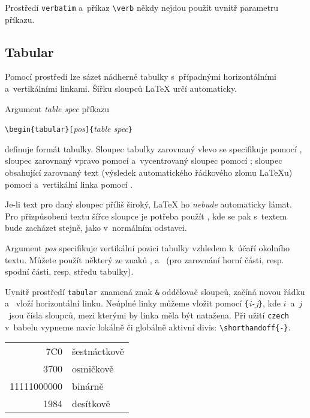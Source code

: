 Prostředí \texttt{verbatim} a~příkaz \verb|\verb| někdy nejdou použít
uvnitř parametru příkazu.

 
\subsection{Tabular}

\newcommand{\mfr}[1]{\framebox{\rule{0pt}{0.7em}\texttt{#1}}}

Pomocí prostředí  lze sázet nádherné tabulky
s~případnými horizontálními a~vertikálními linkami. Šířku sloupců
\LaTeX{} určí automaticky.

Argument \emph{table spec} příkazu
\begin{lscommand}
\verb|\begin{tabular}[|\emph{pos}\verb|]{|\emph{table spec}\verb|}|
\end{lscommand} 
\noindent definuje formát tabulky. Sloupec tabulky zarovnaný vlevo
se specifikuje pomocí \mfr{l}, sloupec zarovnaný vpravo pomocí \mfr{r}
a~vycentrovaný sloupec pomocí \mfr{c}; sloupec obsahující zarovnaný
text (výsledek automatického řádkového zlomu \LaTeX u) pomocí
\mfr{p\{\emph{width}\}} a~vertikální linka pomocí \mfr{|}.

Je-li text pro daný sloupec příliš široký, \LaTeX{} ho
\emph{nebude} automaticky lámat. Pro přizpůsobení textu šířce sloupce
je potřeba použít \mfr{p\{\emph{width}\}}, kde se pak s~textem
bude zacházet stejně, jako v~normálním odstavci.

Argument \emph{pos} specifikuje vertikální pozici tabulky vzhledem
k~účaří okolního textu. Můžete použít některý ze znaků \mfr{t}, \mfr{b}
a~\mfr{c} (pro zarovnání horní části, resp. spodní části, resp. středu
tabulky).
 
Uvnitř prostředí \texttt{tabular} znamená znak \texttt{\&} oddělovač
sloupců, \ci{\bs} začíná novou řádku a~ vloží horizontální
linku.  Neúplné linky můžeme vložit pomocí
\texttt{\{}\emph{i}\texttt{-}\emph{j}\texttt{\}},
kde $i$~a~$j$~jsou čísla sloupců, mezi kterými by linka měla být natažena.
Při užití \texttt{czech} v~\textsf{babel}u vypneme navíc lokálně či globálně aktivní divis: \verb+\shorthandoff{-}+.


\begin{example}
\begin{tabular}{|r|l|}
\hline
7C0 & šestnáctkově \\
3700 & osmičkově \\ \cline{2-2}
11111000000 & binárně \\
\hline \hline
1984 & desítkově \\
\hline
\end{tabular}
\end{example}

